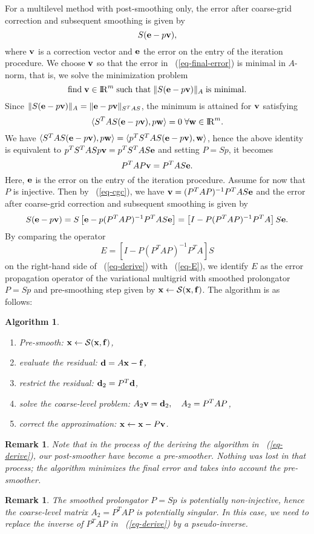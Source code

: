 \documentclass[twoside, 12pt]{article}
\renewcommand{\Re}{{\rm I\negthinspace R}}
\newcommand{\vc}[1]{{\bf #1}} 			%
\newcommand{\eq}[1]{\begin{equation}\label{eq-#1}}
\newcommand{\qe}{\end{equation}}
\newcommand{\eqr}[1]{~(\ref{eq-#1})}        %
\newtheorem{algorithm}{Algorithm}
\newtheorem{notenote}[theorem]{Remark}
\newenvironment{note}{\begin{notenote}\rm}{\end{notenote}}
\begin{document}
For a multilevel method with post-smoothing only, the
error after coarse-grid correction and subsequent smoothing is
given by
\eq{final-error}
       S(\vc{e}-p\vc{v}),
\qe
where $\vc{v}$ is a correction vector and $\vc{e}$ the error on the entry
of the iteration  procedure. We choose $\vc{v}$ so that
the error in \eqr{final-error} is minimal in $A$-norm,
that is, we solve the minimization
problem
\eq{var-object}
   \mbox{find}\;\vc{v} \in \Re^m\;\mbox{such that} \;
   \|S(\vc{e}-p\vc{v})\|_A \;\mbox{is minimal}.
\qe
Since $\|S(\vc{e}-p\vc{v})\|_A=\|\vc{e}-p\vc{v}\|_{S^TAS}$,
the minimum is attained for $\vc{v}$ satisfying
$$
 \langle S^TAS(\vc{e}-p\vc{v}),p\vc{w} \rangle = 0\;
 \forall \vc{w} \in \Re^m.
$$
We have $\langle S^TAS(\vc{e}-p\vc{v}),p\vc{w} \rangle =
 \langle p^TS^TAS(\vc{e}-p\vc{v}),\vc{w}\rangle$,
hence the above identity is equivalent to $p^TS^TASp\vc{v} = p^TS^TAS\vc{e}$
and setting $P=Sp$, it becomes
\eq{cgc}
  P^TAP \vc{v} =P^TAS\vc{e}.
\qe
Here, $\vc{e}$ is the error on the entry of the iteration procedure.
Assume for now that $P$ is injective.
Then by \eqr{cgc}, we have
$\vc{v}=(P^TAP)^{-1}P^TAS\vc{e}$ and the error after coarse-grid correction
and subsequent smoothing is given by
\eq{derive}
     S(\vc{e}-p\vc{v})=S\left[\vc{e} - p(P^TAP)^{-1}P^TAS\vc{e} \right] =
     \left[I - P(P^TAP)^{-1}P^TA \right] S\vc{e}.
\qe
By comparing the operator
\eq{E-result}
    E=\left[I - P(P^TAP)^{-1}P^TA \right] S
\qe
on the right-hand side
of \eqr{derive} with \eqr{E}, we identify $E$ as the error propagation
operator
of the variational multigrid with smoothed
prolongator $P=Sp$ and pre-smoothing
step given by $\vc{x} \leftarrow {\mathcal S}(\vc{x},\vc{f})$.
The algorithm is as follows:
\begin{algorithm}
\label{alg-SMA}
\quad
\begin{enumerate}
\item Pre-smooth: $\vc{x} \leftarrow {\mathcal S}(\vc{x},\vc{f})$,
\item evaluate the residual: $\vc{d}=A\vc{x}-\vc{f}$,
\item restrict the residual: $\vc{d}_2 = P^T\vc{d}$,
\item solve the coarse-level problem:
      $A_2 \vc{v} = \vc{d}_2,\quad A_2 = P^TAP$,
\item correct the approximation:
      $\vc{x}\leftarrow \vc{x} - P\vc{v}$.
\end{enumerate}
\end{algorithm}

\begin{note}
Note that in the process of the deriving the algorithm in \eqr{derive},
our post-smoother have become a pre-smoother. Nothing was lost in that
process; the algorithm minimizes the final error and takes into account
the pre-smoother.
\end{note}
\begin{note}
The smoothed prolongator $P=Sp$ is potentially non-injective, hence the
coarse-level matrix $A_2=P^TAP$ is potentially singular. In this case,
we need to replace the inverse of $P^TAP$ in \eqr{derive} by a
pseudo-inverse.
\end{note}
\end{document}
